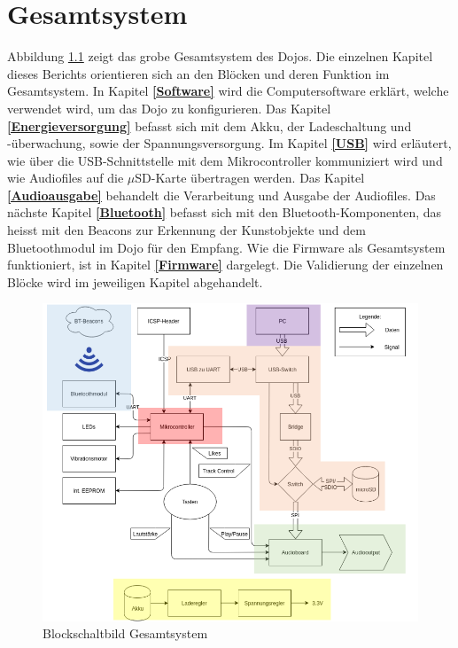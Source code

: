 \chapter{Gesamtsystem}
\thispagestyle{fancy} 





Abbildung \ref{Blockschaltbild_Gesamtsystem} zeigt das grobe Gesamtsystem des Dojos. Die einzelnen Kapitel dieses Berichts orientieren sich an den Blöcken und deren Funktion im Gesamtsystem. In Kapitel \textbf{\ref{Software} } wird die Computersoftware erklärt, welche verwendet wird, um das Dojo zu konfigurieren. Das Kapitel \textbf{\ref{Energieversorgung} } befasst sich mit dem Akku, der Ladeschaltung und -überwachung, sowie der Spannungsversorgung. Im Kapitel \textbf{\ref{USB} } wird erläutert, wie über die USB-Schnittstelle mit dem Mikrocontroller kommuniziert wird und wie Audiofiles auf die $\mu$SD-Karte übertragen werden. Das Kapitel \textbf{\ref{Audioausgabe} } behandelt die Verarbeitung und Ausgabe der Audiofiles. Das nächste Kapitel \textbf{\ref{Bluetooth} } befasst sich mit den Bluetooth-Komponenten, das heisst mit den Beacons zur Erkennung der Kunstobjekte und dem Bluetoothmodul im Dojo für den Empfang. Wie die Firmware als Gesamtsystem funktioniert, ist in Kapitel \textbf{\ref{Firmware} } dargelegt. Die Validierung der einzelnen Blöcke wird im jeweiligen Kapitel abgehandelt.

\begin{figure}[h]
	\centering
	\includegraphics[width=14cm]{Bilder/Gesamtsystem.png}
	\caption{Blockschaltbild Gesamtsystem}
	\label{Blockschaltbild_Gesamtsystem}
\end{figure}

